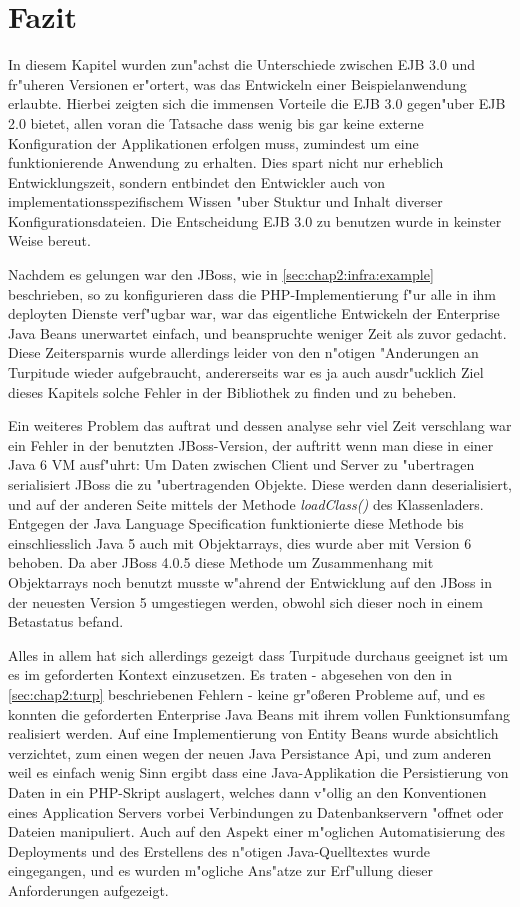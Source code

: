 \section{Fazit}
\label{sec:chap2:fazit}

In diesem Kapitel wurden zun"achst die Unterschiede zwischen EJB 3.0 und fr"uheren Versionen er"ortert, was
das Entwickeln einer Beispielanwendung erlaubte. Hierbei zeigten sich die immensen Vorteile die EJB 3.0 gegen"uber
EJB 2.0 bietet, allen voran die Tatsache dass wenig bis gar keine externe Konfiguration der Applikationen erfolgen
muss, zumindest um eine funktionierende Anwendung zu erhalten. Dies spart nicht nur erheblich Entwicklungszeit,
sondern entbindet den Entwickler auch von implementationsspezifischem Wissen "uber Stuktur und Inhalt diverser
Konfigurationsdateien. Die Entscheidung EJB 3.0 zu benutzen wurde in keinster Weise bereut.

Nachdem es gelungen war den JBoss, wie in \ref{sec:chap2:infra:example} beschrieben, so zu konfigurieren dass
die PHP-Implementierung f"ur alle in ihm deployten Dienste verf"ugbar war, war das eigentliche Entwickeln der
Enterprise Java Beans unerwartet einfach, und beanspruchte weniger Zeit als zuvor gedacht. Diese Zeitersparnis
wurde allerdings leider von den n"otigen "Anderungen an Turpitude wieder aufgebraucht, andererseits war
es ja auch ausdr"ucklich Ziel dieses Kapitels solche Fehler in der Bibliothek zu finden und zu beheben.

Ein weiteres Problem das auftrat und dessen analyse sehr viel Zeit verschlang war ein Fehler in der benutzten JBoss-Version, 
der auftritt wenn man diese in einer Java 6 VM ausf"uhrt:
Um Daten zwischen Client und Server zu "ubertragen serialisiert JBoss die zu "ubertragenden Objekte. Diese
werden dann deserialisiert, und auf der anderen Seite mittels der Methode \emph{loadClass()} des Klassenladers.
Entgegen der Java Language Specification funktionierte diese Methode bis einschliesslich Java 5 auch mit Objektarrays,
dies wurde aber mit Version 6 behoben. Da aber JBoss 4.0.5 diese Methode um Zusammenhang mit Objektarrays noch benutzt
musste w"ahrend der Entwicklung auf den JBoss in der neuesten Version 5 umgestiegen werden, obwohl sich dieser noch
in einem Betastatus befand.

Alles in allem hat sich allerdings gezeigt dass Turpitude durchaus geeignet ist um es im geforderten Kontext
einzusetzen. Es traten - abgesehen von den in \ref{sec:chap2:turp} beschriebenen Fehlern - keine gr"o\ss eren Probleme
auf, und es konnten die geforderten Enterprise Java Beans mit ihrem vollen Funktionsumfang realisiert werden.
Auf eine Implementierung von Entity Beans wurde absichtlich verzichtet, zum einen wegen der neuen Java Persistance Api,
und zum anderen weil es einfach wenig Sinn ergibt dass eine Java-Applikation die Persistierung von Daten in ein
PHP-Skript auslagert, welches dann v"ollig an den Konventionen eines Application Servers vorbei Verbindungen zu Datenbankservern
"offnet oder Dateien manipuliert.
Auch auf den Aspekt einer m"oglichen Automatisierung des Deployments und des Erstellens des n"otigen Java-Quelltextes
wurde eingegangen, und es wurden m"ogliche Ans"atze zur Erf"ullung dieser Anforderungen aufgezeigt.

